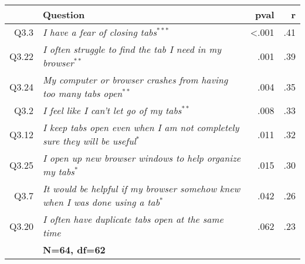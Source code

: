 \begin{tabular}{r p{5.15cm} r r}
\hline
& \textbf{Question} & \textbf{pval} & \textbf{r} \\ 
\hline
Q3.3 & \emph{I have a fear of closing tabs}$^{***}$ & \small{<.001} & .41 \\
Q3.22& \emph{I often struggle to find the tab I need in my browser}$^{**}$ & .001 & .39 \\
Q3.24& \emph{My computer or browser crashes from having too many tabs open}$^{**}$ & .004 & .35 \\
Q3.2& \emph{I feel like I can't let go of my tabs}$^{**}$ & .008 & .33 \\
Q3.12& \emph{I keep tabs open even when I am not completely sure they will be useful}$^{*}$ & .011 & .32 \\
Q3.25& \emph{I open up new browser windows to help organize my tabs}$^{*}$ & .015 & .30 \\
Q3.7& \emph{It would be helpful if my browser somehow knew when I was done using a tab}$^{*}$ & .042 & .26 \\
Q3.20& \emph{I often have duplicate tabs open at the same time} & .062 & .23 \\
\hline
& \textbf{N=64, df=62} & & \\
\hline
\end{tabular}